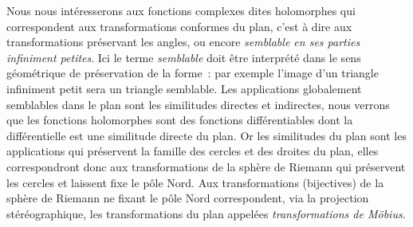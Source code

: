 %

Nous nous intéresserons aux fonctions complexes dites holomorphes qui correspondent aux transformations conformes du plan, c'est à dire aux transformations préservant les angles, ou encore \emph{semblable en ses parties infiniment petites}. Ici le terme \emph{semblable} doit être interprété dans le sens géométrique de préservation de la forme~: par exemple l'image d'un triangle infiniment petit sera un triangle semblable. Les applications globalement semblables dans le plan sont les similitudes directes et indirectes, nous verrons que les fonctions holomorphes sont des fonctions différentiables dont la différentielle est une similitude directe du plan. Or les similitudes du plan sont les applications qui préservent la famille des cercles et des droites du plan, elles correspondront donc aux transformations de la sphère de Riemann qui préservent les cercles et laissent fixe le pôle Nord. Aux transformations (bijectives) de la sphère de Riemann ne fixant le pôle Nord correspondent, via la projection stéréographique, les transformations du plan appelées \emph{transformations de Möbius}.


